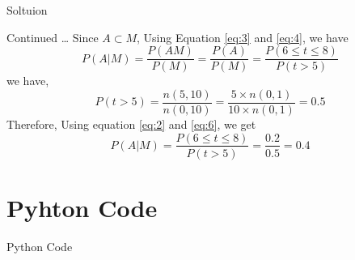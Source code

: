 \documentclass{beamer}
\begin{document}
\begin{frame}{Soltuion}
    \begin{block}{Continued \ldots}
        Since $A \subset M$, Using Equation \eqref{eq:3} and \eqref{eq:4}, we have
        \begin{equation}
            P(A|M) = \frac{P(AM)}{P(M)} = \frac{P(A)}{P(M)} = \frac{P(6 \leq t \leq 8)}{P(t > 5)} 
        \end{equation}
        we have,
        \begin{equation}
            P(t > 5) = \frac{n(5,10)}{n(0,10)} = \frac{5 \times n(0,1)}{10 \times n(0,1)} = 0.5 \label{eq:6}
        \end{equation}
        Therefore, Using equation \eqref{eq:2} and \eqref{eq:6}, we get
        \begin{equation}
            P(A|M) = \frac{P(6 \leq t \leq 8)}{P(t > 5)} = \frac{0.2}{0.5} = 0.4
        \end{equation}
    \end{block}
\end{frame}
\section{Pyhton Code}
\begin{frame}{Python Code}
    
\end{frame}
\end{document}

